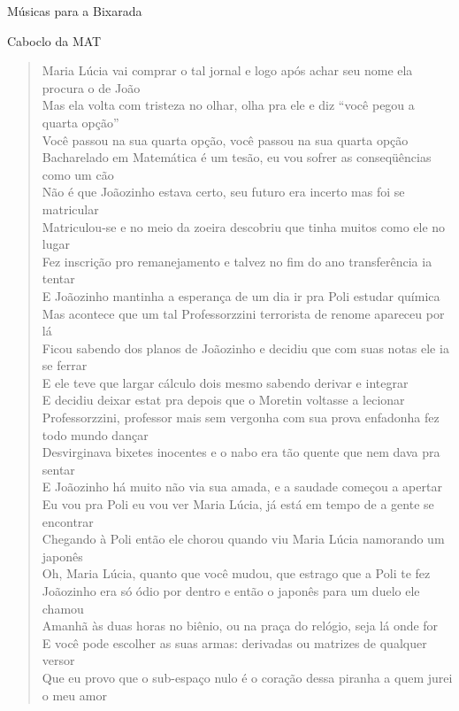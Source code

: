 \begin{secao}{Músicas para a Bixarada}
\begin{subsecao}{Caboclo da MAT}
\begin{verse}
{Maria Lúcia vai comprar o tal jornal e logo após achar seu nome ela procura o de
João\\
Mas ela volta com tristeza no olhar, olha pra ele e diz ``você pegou a quarta
opção''\\
Você passou na sua quarta opção, você passou na sua quarta opção\\
Bacharelado em Matemática é um tesão, eu vou sofrer as conseqüências como um cão\\
Não é que Joãozinho estava certo, seu futuro era incerto mas foi se matricular\\
Matriculou-se e no meio da zoeira descobriu que tinha muitos como ele no lugar\\
Fez inscrição pro remanejamento e talvez no fim do ano transferência ia tentar\\
E Joãozinho mantinha a esperança de um dia ir pra Poli estudar química\\
Mas acontece que um tal Professorzzini terrorista de renome apareceu por lá\\
Ficou sabendo dos planos de Joãozinho e decidiu que com suas notas ele ia se
ferrar\\
E ele teve que largar cálculo dois mesmo sabendo derivar e integrar\\
E decidiu deixar estat pra depois que o Moretin voltasse a lecionar\\
Professorzzini, professor mais sem vergonha com sua prova enfadonha fez todo
mundo dançar\\
Desvirginava bixetes inocentes e o nabo era tão quente que nem dava pra sentar\\
E Joãozinho há muito não via sua amada, e a saudade começou a apertar\\
Eu vou pra Poli eu vou ver Maria Lúcia, já está em tempo de a gente se encontrar\\
Chegando à Poli então ele chorou quando viu Maria Lúcia namorando um japonês\\
Oh, Maria Lúcia, quanto que você mudou, que estrago que a Poli te fez\\
Joãozinho era só ódio por dentro e então o japonês para um duelo ele chamou\\
Amanhã às duas horas no biênio, ou na praça do relógio, seja lá onde for\\
E você pode escolher as suas armas: derivadas ou matrizes de qualquer versor\\
Que eu provo que o sub-espaço nulo é o coração dessa piranha a quem jurei o meu
amor\\
}
\end{verse}
\end{subsecao}
\end{secao}
